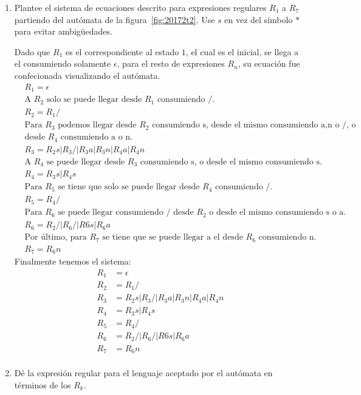 \documentclass[spanish, fleqn]{article}
\begin{document}
  \begin{enumerate}
  \item %
    Plantee el sistema de ecuaciones descrito
    para expresiones regulares \(R_1\) a \(R_7\)
    partiendo del autómata de la figura~\ref{fig:20172t2}.
    Use \(s\) en vez del símbolo \(*\) para evitar ambigüedades.
    
    Dado que $R_{1}$ es el correspondiente al estado $1$, el cual es el inicial, se llega a el consumiendo solamente $\epsilon$, para el resto de expresiones $R_{n}$, su ecuación fue confecionada visualizando el autómata. 
    \begin{align*}
    &R_{1}=\epsilon \\
    &\text{A $R_2$ solo se puede llegar desde $R_1$ consumiendo /.}\\
    &R_{2}=R_{1}/\\
    &\text{Para $R_3$ podemos llegar desde $R_2$ consumiendo s, desde el mismo consumiendo a,n o /, o}\\
    &\text{desde $R_4$ consumiendo a o n.}\\
    &R_{3}=R_{2}s|R_{3}/|R_{3}a|R_{3}n|R_{4}a|R_{4}n\\
    &\text{A $R_4$ se puede llegar desde $R_3$ consumiendo s, o desde el mismo consumiendo s.}\\
    &R_{4}=R_{3}s|R_{4}s
    \end{align*}
    \begin{align*}
    &\text{Para $R_5$ se tiene que solo se puede llegar desde $R_4$ consumiendo /.}\\
    &R_{5}=R_{4}/\\
    &\text{Para $R_6$ se puede llegar consumiendo / desde $R_2$ o desde el mismo consumiendo s o a.}\\
    &R_{6}=R_{2}/|R_{6}/|R{6}s|R_{6}a\\
    &\text{Por último, para $R_7$ se tiene que se puede llegar a el desde $R_6$ consumiendo n.}\\
    &R_{7}=R_{6}n
    \end{align*}
    Finalmente tenemos el sistema:
    \begin{align*}
    R_{1}&=\epsilon \\
    R_{2}&=R_{1}/\\
    R_{3}&=R_{2}s|R_{3}/|R_{3}a|R_{3}n|R_{4}a|R_{4}n\\
    R_{4}&=R_{3}s|R_{4}s\\
    R_{5}&=R_{4}/\\
    R_{6}&=R_{2}/|R_{6}/|R{6}s|R_{6}a\\
    R_{7}&=R_{6}n\\
	\end{align*}
  \item %
    \label{ques:20172t2p2}
    Dé la expresión regular para el lenguaje aceptado por el autómata
    en términos de los \(R_k\).
    

\end{enumerate}
\end{document}
